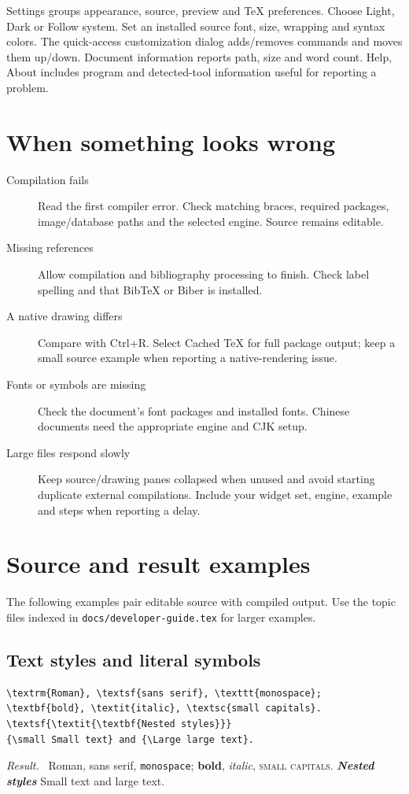 \documentclass[11pt]{article}
\newcommand{\result}{\par\noindent\textit{Result.}\ }
\begin{document}
Settings groups appearance, source, preview and \TeX{} preferences. Choose Light,
Dark or Follow system. Set an installed source font, size, wrapping and syntax colors.
The quick-access customization dialog adds/removes commands and moves them up/down.
Document information reports path, size and word count. Help, About includes
program and detected-tool information useful for reporting a problem.

\section{When something looks wrong}
\begin{description}
\item[Compilation fails] Read the first compiler error. Check matching braces,
required packages, image/database paths and the selected engine. Source remains editable.
\item[Missing references] Allow compilation and bibliography processing
to finish. Check label spelling and that BibTeX or Biber is installed.
\item[A native drawing differs] Compare with Ctrl+R. Select Cached TeX for full
package output; keep a small source example when reporting a native-rendering issue.
\item[Fonts or symbols are missing] Check the document's font packages and installed
fonts. Chinese documents need the appropriate engine and CJK setup.
\item[Large files respond slowly] Keep source/drawing panes collapsed when unused
and avoid starting duplicate external compilations. Include your widget set,
engine, example and steps when reporting a delay.
\end{description}

\appendix
\section{Source and result examples}
The following examples pair editable source with compiled output.
Use the topic files indexed in \texttt{docs/developer-guide.tex} for larger examples.

\subsection{Text styles and literal symbols}
\begin{verbatim}
\textrm{Roman}, \textsf{sans serif}, \texttt{monospace};
\textbf{bold}, \textit{italic}, \textsc{small capitals}.
\textsf{\textit{\textbf{Nested styles}}}
{\small Small text} and {\Large large text}.
\end{verbatim}
\result
\textrm{Roman}, \textsf{sans serif}, \texttt{monospace};
\textbf{bold}, \textit{italic}, \textsc{small capitals}.
\textsf{\textit{\textbf{Nested styles}}}
{\small Small text} and {\Large large text}.
\end{document}
